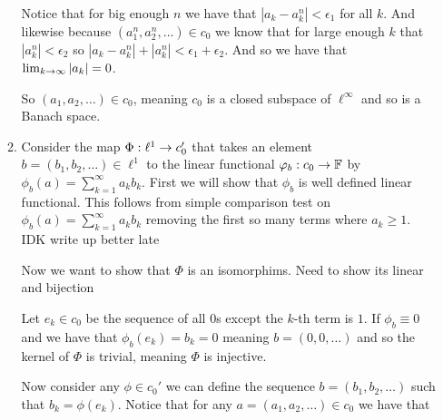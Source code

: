 \documentclass[12pt]{amsart}
\begin{document}
\begin{itemize}
\begin{enumerate}[label=(\alph*)]
    Notice that for big enough $n$ we have that $|a_k-a_k^n|<\epsilon_1$ for all $k$. And likewise because $(a^n_1,a^n_2,\dots)\in c_0$ we know that
    for large enough $k$ that $|a^n_k|<\epsilon_2$ so $|a_k-a^n_k|+|a^n_k|<\epsilon_1+\epsilon_2$. And so we have that $\lim_{k\rightarrow\infty}|a_k|=0$.

    So $(a_1,a_2,\dots)\in c_0$, meaning $c_0$ is a closed 
    subspace of $\ell^\infty$ and so is a Banach space.



    \item %
    Consider the map $\Phi:\ell^1\rightarrow c_0'$ that takes an element $b=(b_1,b_2,\dots)\in \ell^1$ to the linear functional $\varphi_b:c_0\rightarrow \mathbb{F}$ by 
    $\phi_b(a)=\sum_{k=1}^\infty a_k b_k$. First we will show that $\phi_b$ is well defined linear functional. 
    This follows from simple comparison test on $\phi_b(a)=\sum_{k=1}^\infty a_k b_k$ removing the first so many terms where $a_k\geq 1$. IDK write up better late

    Now we want to show that $\Phi$ is an isomorphims. Need to show its linear and bijection

    Let $e_k\in c_0$ be the sequence of all $0$s except the $k$-th term is $1$. 
    If $\phi_b\equiv 0$ and we have that $\phi_b(e_k)=b_k=0$ meaning $b=(0,0,\dots)$ and so the kernel of $\Phi$ is trivial, meaning $\Phi$ is injective.

    Now consider any $\phi\in c_0'$ we can define the sequence $b=(b_1,b_2,\dots)$ such that $b_k=\phi(e_k)$. 
    Notice that for any $a=(a_1,a_2,\dots)\in c_0$ we have
    that

   \end{enumerate}


\end{itemize}
\end{document}
